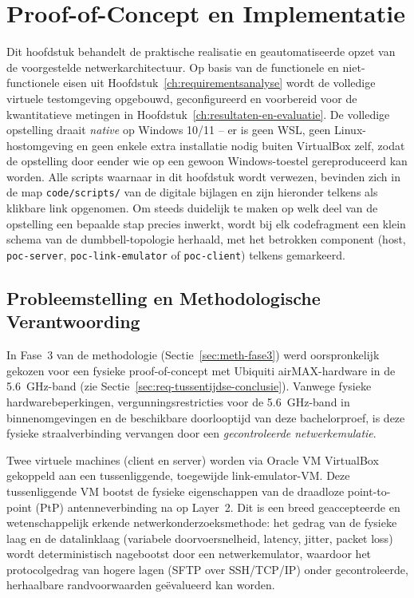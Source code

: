 
\chapter{Proof-of-Concept en Implementatie}%
\label{ch:proof-of-concept}

Dit hoofdstuk behandelt de praktische realisatie en geautomatiseerde opzet van de
voorgestelde netwerkarchitectuur. Op basis van de functionele en niet-functionele eisen
uit Hoofdstuk~\ref{ch:requirementsanalyse} wordt de volledige virtuele testomgeving
opgebouwd, geconfigureerd en voorbereid voor de kwantitatieve metingen in
Hoofdstuk~\ref{ch:resultaten-en-evaluatie}. De volledige opstelling draait \emph{native}
op Windows 10/11 -- er is geen WSL, geen Linux-hostomgeving en geen enkele extra
installatie nodig buiten VirtualBox zelf, zodat de opstelling door eender wie op een
gewoon Windows-toestel gereproduceerd kan worden. Alle scripts waarnaar in dit hoofdstuk
wordt verwezen, bevinden zich in de map \texttt{code/scripts/} van de digitale bijlagen
en zijn hieronder telkens als klikbare link opgenomen. Om steeds duidelijk te maken op welk deel van de opstelling een
bepaalde stap precies inwerkt, wordt bij elk codefragment een klein schema van de
dumbbell-topologie herhaald, met het betrokken component (host, \texttt{poc-server},
\texttt{poc-link-emulator} of \texttt{poc-client}) telkens gemarkeerd.

\section{Probleemstelling en Methodologische Verantwoording}%
\label{sec:sim-verantwoording}

In Fase~3 van de methodologie (Sectie~\ref{sec:meth-fase3}) werd oorspronkelijk gekozen
voor een fysieke proof-of-concept met Ubiquiti airMAX-hardware in de 5.6~GHz-band (zie
Sectie~\ref{sec:req-tussentijdse-conclusie}). Vanwege fysieke hardwarebeperkingen,
vergunningsrestricties voor de 5.6~GHz-band in binnenomgevingen en de beschikbare
doorlooptijd van deze bachelorproef, is deze fysieke straalverbinding vervangen door een
\emph{gecontroleerde netwerkemulatie}.

Twee virtuele machines (client en server) worden via Oracle VM VirtualBox gekoppeld aan
een tussenliggende, toegewijde link-emulator-VM. Deze tussenliggende VM bootst de
fysieke eigenschappen van de draadloze point-to-point (PtP) antenneverbinding na op
Layer~2. Dit is een breed geaccepteerde en wetenschappelijk erkende
netwerkonderzoeksmethode: het gedrag van de fysieke laag en de datalinklaag (variabele
doorvoersnelheid, latency, jitter, packet loss) wordt deterministisch nagebootst door een
netwerkemulator, waardoor het protocolgedrag van hogere lagen (SFTP over SSH/TCP/IP)
onder gecontroleerde, herhaalbare randvoorwaarden geëvalueerd kan worden.

